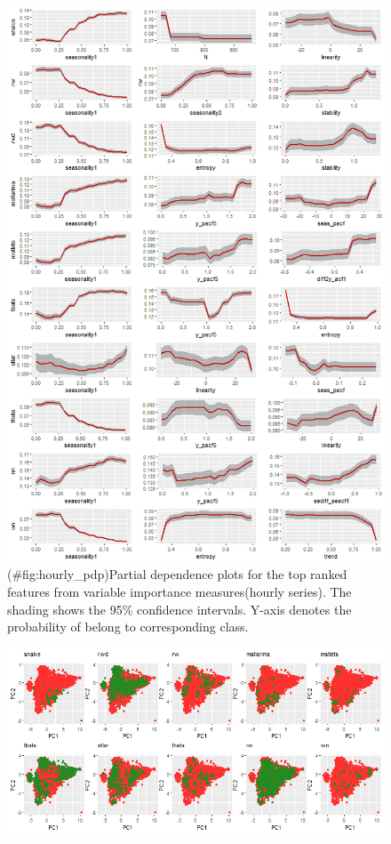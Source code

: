 \documentclass[11pt,a4paper,]{article}
\theoremstyle{definition}
\theoremstyle{definition}
\theoremstyle{definition}
\theoremstyle{remark}
\begin{document}
\newpage

\begin{figure}
\centering
\includegraphics{figures/hourly_pdp-1.png}
\caption{(\#fig:hourly\_pdp)Partial dependence plots for the top ranked
features from variable importance measures(hourly series). The shading
shows the 95\% confidence intervals. Y-axis denotes the probability of
belong to corresponding class.}
\end{figure}

\newpage

\begin{figure}[h]

{\centering \includegraphics{figures/pca_hourly-1} 

}

\end{figure}
\end{document}
